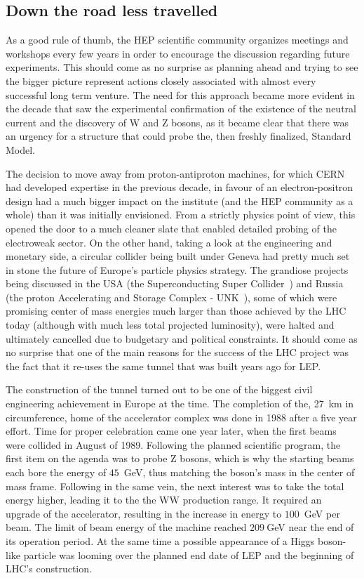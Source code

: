 \subsection{Down the road less travelled}
\hspace{10pt} As a good rule of thumb, the HEP scientific community organizes meetings and workshops every few years in order to encourage the discussion regarding future experiments. This should come as no surprise as planning ahead and trying to see the bigger picture represent actions closely associated with almost every successful long term venture. The need for this approach became more evident in the decade that saw the experimental confirmation of the existence of the neutral current and the discovery of W and Z bosons, as it became clear that there was an urgency for a structure that could probe the, then freshly finalized, Standard Model.

\hspace{10pt} The decision to move away from proton-antiproton machines, for which CERN had developed expertise in the previous decade, in favour of an electron-positron design had a much bigger impact on the institute (and the HEP community as a whole) than it was initially envisioned. From a strictly physics point of view, this opened the door to a much cleaner slate that enabled detailed probing of the electroweak sector. On the other hand, taking a look at the engineering and monetary side, a circular collider being built under Geneva had pretty much set in stone the future of Europe's particle physics strategy. The grandiose projects being discussed in the USA (the Superconducting Super Collider~\cite{SSC_proposal}) and Russia (the proton Accelerating and Storage Complex - UNK~\cite{UNK_proposal}), some of which were promising center of mass energies much larger than those achieved by the LHC today (although with much less total projected luminosity), were halted and ultimately cancelled due to budgetary and political constraints. It should come as no surprise that one of the main reasons for the success of the LHC project was the fact that it re-uses the same tunnel that was built years ago for LEP.

\hspace{10pt} The construction of the tunnel turned out to be one of the biggest civil engineering achievement in Europe at the time. The completion of the, 27~km in circumference, home of the accelerator complex was done in 1988 after a five year effort. Time for proper celebration came one year later, when the first beams were collided in August of 1989. Following the planned scientific program, the first item on the agenda was to probe Z bosons, which is why the starting beams each bore the energy of $45$~GeV, thus matching the boson's mass in the center of mass frame. Following in the same vein, the next interest was to take the total energy higher, leading it to the the WW production range. It required an upgrade of the accelerator, resulting in the increase in energy to $100$~GeV per beam. The limit of beam energy of the machine reached $209~$GeV near the end of its operation period. At the same time a possible appearance of a Higgs boson-like particle was looming over the planned end date of LEP and the beginning of LHC's construction.

